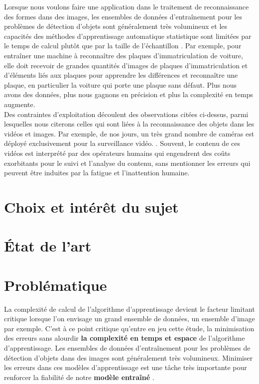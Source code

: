 		Lorsque nous voulons faire une application dans le traitement de reconnaissance des formes dans des images, les ensembles de données d'entraînement pour les  problèmes de détection d'objets sont généralement très volumineux et les capacités des méthodes d'apprentissage automatique statistique sont limitées par le temps de calcul plutôt que par la taille de l'échantillon \cite{bottou2010large}.
		Par exemple, pour entraîner une machine à reconnaître des plaques d'immatriculation de voiture, elle doit recevoir de grandes quantités d'images de plaques d'immatriculation et d'éléments liés aux plaques pour apprendre les différences et reconnaître une plaque, en particulier la voiture qui porte une plaque sans défaut. Plus nous avons des données, plus nous gagnons en précision et plus la complexité en temps augmente.\\
		Des contraintes d'exploitation découlent des observations citées ci-dessus, parmi lesquelles nous citerons celles qui sont liées à la reconnaissance des objets dans les vidéos et images. Par exemple, de nos jours, un très grand nombre de caméras est déployé exclusivement pour la surveillance vidéo. \cite{ahadjitse2013reconnaissance}. Souvent, le contenu de ces vidéos est interprété par des opérateurs humains qui engendrent des coûts exorbitants pour le suivi et l'analyse du contenu, sans mentionner les erreurs qui peuvent être induites par la fatigue et l'inattention humaine. 
		
		
	\section{Choix et intérêt du sujet}
	
	\section{État de l’art}
		
	
	\section{Problématique}
		La complexité de calcul de l'algorithme d'apprentissage devient le facteur limitant critique lorsque l'on envisage un grand ensemble de données, un ensemble d’image par exemple. C'est à ce point critique qu'entre en jeu cette étude, la minimisation des erreurs sans alourdir \textbf{la complexité en temps et espace} de l’algorithme d’apprentissage.   
		Les ensembles de données d'entraînement pour les problèmes de détection d'objets dans des images sont généralement très volumineux. Minimiser les erreurs dans ces modèles d’apprentissage est une tâche très importante pour renforcer la fiabilité de notre \textbf{modèle entraîné} \cite{ibm2018ml}. 
		
